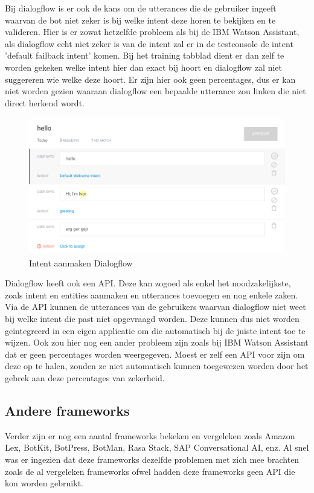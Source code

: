 Bij dialogflow is er ook de kans om de utterances die de gebruiker ingeeft waarvan de bot niet zeker is bij welke intent deze horen te bekijken en te valideren. Hier is er zowat hetzelfde probleem als bij de IBM Watson Assistant, als dialogflow echt niet zeker is van de intent zal er in de testconsole de intent 'default failback intent' komen. Bij het training tabblad dient er dan zelf te worden gekeken welke intent hier dan exact bij hoort en dialogflow zal niet suggereren wie welke deze hoort. Er zijn hier ook geen percentages, dus er kan niet worden gezien waaraan dialogflow een bepaalde utterance zou linken die niet direct herkend wordt.

\begin{figure}[h!]
	\centering
	\includegraphics[height=6cm]{img/dia_training.png}
	\caption{Intent aanmaken Dialogflow}
	\label{fig:trainingdialogflow}
\end{figure}

Dialogflow heeft ook een API. Deze kan zogoed als enkel het noodzakelijkste, zoals intent en entities aanmaken en utterances toevoegen en nog enkele zaken. Via de API kunnen de utterances van de gebruikers waarvan dialogflow niet weet bij welke intent die past niet opgevraagd worden. Deze kunnen dus niet worden geïntegreerd in een eigen applicatie om die automatisch bij de juiste intent toe te wijzen. Ook zou hier nog een ander probleem zijn zoals bij IBM Watson Assistant dat er geen percentages worden weergegeven. Moest er zelf een API voor zijn om deze op te halen, zouden ze niet automatisch kunnen toegewezen worden door het gebrek aan deze percentages van zekerheid.

\subsection{Andere frameworks}
\label{andereFrameworks}

Verder zijn er nog een aantal frameworks bekeken en vergeleken zoals Amazon Lex, BotKit, BotPress, BotMan, Rasa Stack, SAP Conversational AI, enz. Al snel was er ingezien dat deze frameworks dezelfde problemen met zich mee brachten zoals de al vergeleken frameworks ofwel hadden deze frameworks geen API die kon worden gebruikt. 


